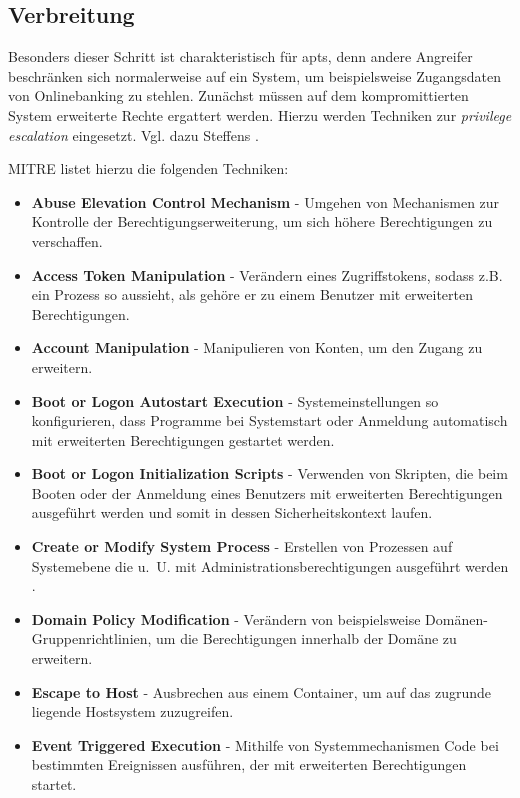 \documentclass[conference]{IEEEtran}
\begin{document}
\subsection{Verbreitung}
\label{sec:proceeding:lateralmovement}

Besonders dieser Schritt ist charakteristisch für \acp{apt}, denn andere Angreifer beschränken sich normalerweise auf ein System, um beispielsweise Zugangsdaten von Onlinebanking zu stehlen.
Zunächst müssen auf dem kompromittierten System erweiterte Rechte ergattert werden.
Hierzu werden Techniken zur \textit{privilege escalation} eingesetzt.
Vgl. dazu Steffens \cite[S.~16f]{Steffens2020}.

MITRE \cite{MITREPrivilegeEscalation} listet hierzu die folgenden Techniken:
\begin{itemize}
    \item \textbf{Abuse Elevation Control Mechanism} - Umgehen von Mechanismen zur Kontrolle der Berechtigungserweiterung, um sich höhere Berechtigungen zu verschaffen.
    \item \textbf{Access Token Manipulation} - Verändern eines Zugriffstokens, sodass z.B.~ ein Prozess so aussieht, als gehöre er zu einem Benutzer mit erweiterten Berechtigungen.
    \item \textbf{Account Manipulation} - Manipulieren von Konten, um den Zugang zu erweitern.
    \item \textbf{Boot or Logon Autostart Execution} - Systemeinstellungen so konfigurieren, dass Programme bei Systemstart oder Anmeldung automatisch mit erweiterten Berechtigungen gestartet werden.
    \item \textbf{Boot or Logon Initialization Scripts} - Verwenden von Skripten, die beim Booten oder der Anmeldung eines Benutzers mit erweiterten Berechtigungen ausgeführt werden und somit in dessen Sicherheitskontext laufen.
    \item \textbf{Create or Modify System Process} - Erstellen von Prozessen auf Systemebene die u.~U. mit Administrationsberechtigungen ausgeführt werden \cite{MITRECreateOrModifySystemProcess}.
    \item \textbf{Domain Policy Modification} - Verändern von beispielsweise Domänen-Gruppenrichtlinien, um die Berechtigungen innerhalb der Domäne zu erweitern.
    \item \textbf{Escape to Host} - Ausbrechen aus einem Container, um auf das zugrunde liegende Hostsystem zuzugreifen.
    \item \textbf{Event Triggered Execution} - Mithilfe von Systemmechanismen Code bei bestimmten Ereignissen ausführen, der mit erweiterten Berechtigungen startet.

\end{itemize}
\end{document}
